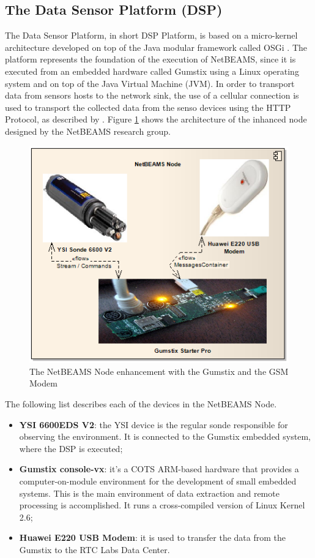 \subsection{The Data Sensor Platform (DSP)}

The Data Sensor Platform, in short DSP Platform, is based on a micro-kernel
architecture developed on top of the Java modular framework called OSGi
\cite{osgi}. The platform represents the foundation of the execution of
NetBEAMS, since it is executed from an embedded hardware called Gumstix
\cite{gumstix} using a Linux operating system and on top of the Java Virtual
Machine (JVM). In order to transport data from sensors hosts to the network
sink, the use of a cellular connection is used to transport the collected data
from the senso devices using the HTTP Protocol, as described by
\cite{netbeams09}. Figure \ref{fig:sf-netbeams-node} shows the
architecture of the inhanced node designed by the NetBEAMS research group.

\begin{figure}
  \centering
  \includegraphics{../diagrams/DSP-Gateway-Node}
  \caption{The NetBEAMS Node enhancement with the Gumstix and the GSM Modem}
  \label{fig:sf-netbeams-node}
\end{figure}

The following list describes each of the devices in the NetBEAMS Node.

\begin{itemize}
  \item \textbf{YSI 6600EDS V2}: the YSI device is the regular sonde
  responsible for observing the environment. It is connected to the Gumstix
  embedded system, where the DSP is executed;
  \item \textbf{Gumstix console-vx}: it's a COTS ARM-based hardware that
  provides a computer-on-module environment for the development of small
  embedded systems. This is the main environment of data extraction and remote
  processing is accomplished. It runs a cross-compiled version of Linux Kernel
  2.6;
  \item \textbf{Huawei E220 USB Modem}: it is used to transfer the data from the
  Gumstix to the RTC Labs Data Center.
\end{itemize} 

